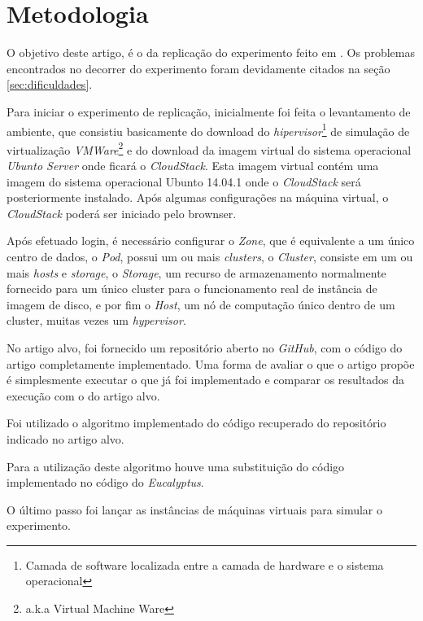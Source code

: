 \section{Metodologia}
\label{sec:metodologia}

O objetivo deste artigo, é o da replicação do experimento feito em \cite{coutinho_et_al:14}. Os problemas encontrados no decorrer do experimento foram devidamente citados na seção \ref{sec:dificuldades}.

Para iniciar o experimento de replicação, inicialmente foi feita o levantamento de ambiente, que consistiu basicamente do download do \textit{hipervisor}\footnote{Camada de software localizada entre a camada de hardware e o sistema operacional\cite{dev_midia}} de simulação de virtualização \textit{VMWare}\footnote{a.k.a Virtual Machine Ware} e do download da imagem virtual do sistema operacional \textit{Ubunto Server} onde ficará o \textit{CloudStack}. Esta imagem virtual contém uma imagem do sistema operacional Ubunto 14.04.1 onde o \textit{CloudStack} será posteriormente instalado. Após algumas configurações na máquina virtual, o \textit{CloudStack} poderá ser iniciado pelo brownser. 

Após efetuado login, é necessário configurar o \textit{Zone}, que é equivalente a um único centro de dados, o \textit{Pod}, possui um ou mais \textit{clusters}, o \textit{Cluster}, consiste em um ou mais \textit{hosts} e \textit{storage}, o \textit{Storage}, um recurso de armazenamento normalmente fornecido para um único cluster para o funcionamento real de instância de imagem de disco, e por fim o \textit{Host}, um nó de computação único dentro de um cluster, muitas vezes um \textit{hypervisor}.

No artigo alvo, foi fornecido um repositório aberto no \textit{GitHub}, com o código do artigo completamente implementado. Uma forma de avaliar o que o artigo propõe é simplesmente executar o que já foi implementado e comparar os resultados da execução com o do artigo alvo.

Foi utilizado o algoritmo implementado do código recuperado do repositório indicado no artigo alvo.

Para a utilização deste algoritmo houve uma substituição do código implementado no código do \textit{Eucalyptus}.

O último passo foi lançar as instâncias de máquinas virtuais para simular o experimento. 
